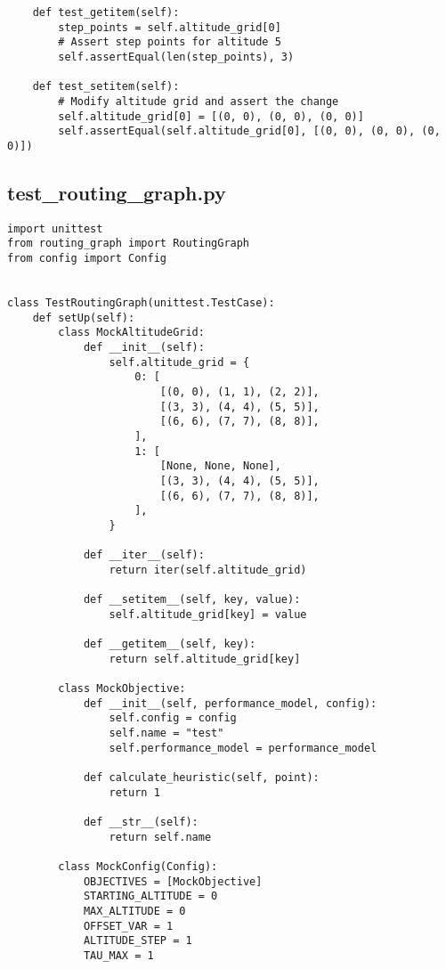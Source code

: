 \begin{verbatim}
    def test_getitem(self):
        step_points = self.altitude_grid[0]
        # Assert step points for altitude 5
        self.assertEqual(len(step_points), 3)

    def test_setitem(self):
        # Modify altitude grid and assert the change
        self.altitude_grid[0] = [(0, 0), (0, 0), (0, 0)]
        self.assertEqual(self.altitude_grid[0], [(0, 0), (0, 0), (0, 0)])

\end{verbatim}
\subsection{test_routing_graph.py}
\begin{verbatim}
import unittest
from routing_graph import RoutingGraph
from config import Config


class TestRoutingGraph(unittest.TestCase):
    def setUp(self):
        class MockAltitudeGrid:
            def __init__(self):
                self.altitude_grid = {
                    0: [
                        [(0, 0), (1, 1), (2, 2)],
                        [(3, 3), (4, 4), (5, 5)],
                        [(6, 6), (7, 7), (8, 8)],
                    ],
                    1: [
                        [None, None, None],
                        [(3, 3), (4, 4), (5, 5)],
                        [(6, 6), (7, 7), (8, 8)],
                    ],
                }

            def __iter__(self):
                return iter(self.altitude_grid)

            def __setitem__(self, key, value):
                self.altitude_grid[key] = value

            def __getitem__(self, key):
                return self.altitude_grid[key]

        class MockObjective:
            def __init__(self, performance_model, config):
                self.config = config
                self.name = "test"
                self.performance_model = performance_model

            def calculate_heuristic(self, point):
                return 1

            def __str__(self):
                return self.name

        class MockConfig(Config):
            OBJECTIVES = [MockObjective]
            STARTING_ALTITUDE = 0
            MAX_ALTITUDE = 0
            OFFSET_VAR = 1
            ALTITUDE_STEP = 1
            TAU_MAX = 1


\end{verbatim}
